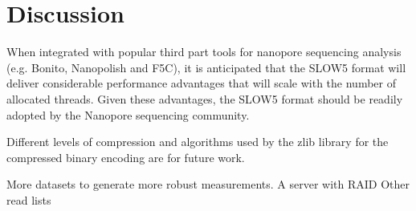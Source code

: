 \section{Discussion}

When integrated with popular third part tools for nanopore sequencing analysis (e.g. Bonito, Nanopolish and F5C), it is anticipated that the SLOW5 format will deliver considerable performance advantages that will scale with the number of allocated threads. Given these advantages, the SLOW5 format should be readily adopted by the Nanopore sequencing community.

Different levels of compression and algorithms used by the zlib library for the compressed binary encoding are for future work.

More datasets to generate more robust measurements.
A server with RAID
Other read lists
